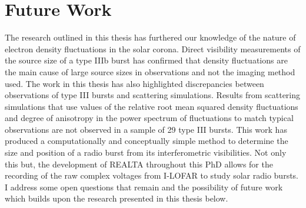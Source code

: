 \section{Future Work}
The research outlined in this thesis has furthered our knowledge of the nature of electron density fluctuations in the solar corona. Direct visibility measurements of the source size of a type IIIb burst has confirmed that density fluctuations are the main cause of large source sizes in observations and not the imaging method used. The work in this thesis has also highlighted discrepancies between observations of type III bursts and scattering simulations. Results from scattering simulations that use values of the relative root mean squared density fluctuations and degree of anisotropy in the power spectrum of fluctuations to match typical observations \citep[e.g.][]{Kontar2017} are not observed in a sample of 29 type III bursts.
This work has produced a computationally and conceptually simple method to determine the size and position of a radio burst from its interferometric visibilities. Not only this but, the development of REALTA throughout this PhD allows for the recording of the raw complex voltages from I-LOFAR to study solar radio bursts. I address some open questions that remain and the possibility of future work which builds upon the research presented in this thesis below.
 
